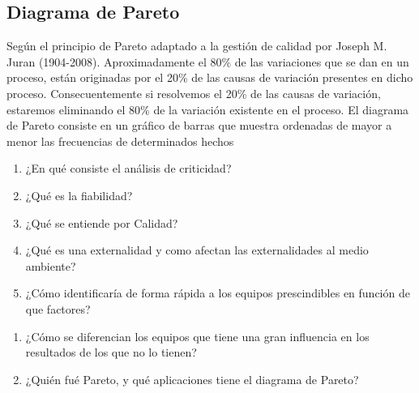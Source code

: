  


\subsection{Diagrama de Pareto}
Según el principio de Pareto adaptado a la gestión de
calidad por Joseph M. Juran (1904-2008).
Aproximadamente el 80\% de las variaciones que se dan en
un proceso, están originadas por el 20\% de las causas de variación presentes en dicho proceso.
Consecuentemente si resolvemos el 20\% de las causas de
variación, estaremos eliminando el 80\% de la variación
existente en el proceso. El diagrama de Pareto consiste en un gráfico de barras que muestra ordenadas de mayor a
menor las frecuencias de determinados hechos


\newpage
{}
\begin{enumerate}
    \item ¿En qué consiste el análisis de criticidad?
    \item ¿Qué es la fiabilidad?
    \item ¿Qué se entiende por Calidad?
    \item ¿Qué es una externalidad y como afectan las externalidades al medio ambiente?
    \item ¿Cómo identificaría de forma rápida a los equipos prescindibles en función de que factores?
\end{enumerate}

\begin{enumerate}
    \item ¿Cómo se diferencian los equipos que tiene una gran influencia en los resultados de los que no lo tienen? 
    \item ¿Quién fué Pareto, y qué aplicaciones tiene el diagrama de Pareto?
    
\end{enumerate}
